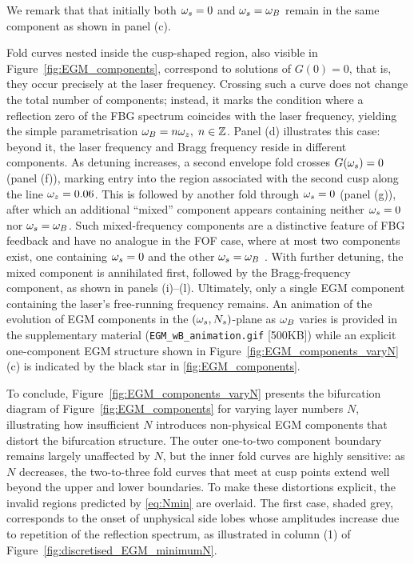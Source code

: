 We remark that that initially both $\omega_s=0$ and $\omega_s=\omega_B$ remain in the same component as shown in panel (c). 
%
\par
%
Fold curves nested inside the cusp-shaped region, also visible in Figure~\ref{fig:EGM_components}, correspond to solutions of $G(0)=0$, that is, they occur precisely at the laser frequency. 
Crossing such a curve does not change the total number of components; instead, it marks the condition where a reflection zero of the FBG spectrum coincides with the laser frequency, yielding the simple parametrisation $\omega_B = n\omega_z, \; n \in \mathbb{Z}$. 
Panel (d) illustrates this case: beyond it, the laser frequency and Bragg frequency reside in different components. 
As detuning increases, a second envelope fold crosses $G(\omega_s)=0$ (panel (f)), marking entry into the region associated with the second cusp along the line $\omega_z = 0.06$. 
This is followed by another fold through $\omega_s=0$ (panel (g)), after which an additional “mixed” component appears containing neither $\omega_s=0$ nor $\omega_s=\omega_B$. 
Such mixed-frequency components are a distinctive feature of FBG feedback and have no analogue in the FOF case, where at most two components exist, one containing $\omega_s=0$ and the other $\omega_s=\omega_B$ \cite{green2006mode}. 
With further detuning, the mixed component is annihilated first, followed by the Bragg-frequency component, as shown in panels (i)--(l). 
Ultimately, only a single EGM component containing the laser’s free-running frequency remains.
An animation of the evolution of EGM components in the $(\omega_s, N_s)$-plane as $\omega_B$ varies is provided in the supplementary material (\texttt{EGM\_wB\_animation.gif} [500KB]) while an explicit one-component EGM structure shown in Figure~\ref{fig:EGM_components_varyN}(c) is indicated by the black star in \ref{fig:EGM_components}.
%
\par
%
To conclude, Figure~\ref{fig:EGM_components_varyN} presents the bifurcation diagram of Figure~\ref{fig:EGM_components} for varying layer numbers $N$, illustrating how insufficient $N$ introduces non-physical EGM components that distort the bifurcation structure. 
The outer one-to-two component boundary remains largely unaffected by $N$, but the inner fold curves are highly sensitive: as $N$ decreases, the two-to-three fold curves that meet at cusp points extend well beyond the upper and lower boundaries. 
To make these distortions explicit, the invalid regions predicted by \eqref{eq:Nmin} are overlaid. 
The first case, shaded grey, corresponds to the onset of unphysical side lobes whose amplitudes increase due to repetition of the reflection spectrum, as illustrated in column (1) of Figure~\ref{fig:discretised_EGM_minimumN}. 

